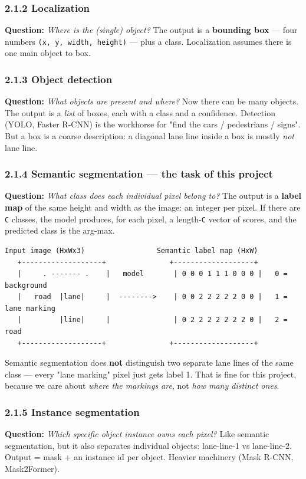 \documentclass[11pt]{article}
\begin{document}
\subsubsection*{2.1.2 Localization}
\textbf{Question:} \textit{Where is the (single) object?} The output is a \textbf{bounding box} --- four numbers \texttt{(x, y, width, height)} --- plus a class. Localization assumes there is one main object to box.

\subsubsection*{2.1.3 Object detection}
\textbf{Question:} \textit{What objects are present and where?} Now there can be many objects. The output is a \textit{list} of boxes, each with a class and a confidence. Detection (YOLO, Faster R-CNN) is the workhorse for "find the cars / pedestrians / signs". But a box is a coarse description: a diagonal lane line inside a box is mostly \textit{not} lane line.

\subsubsection*{2.1.4 Semantic segmentation --- the task of this project}
\textbf{Question:} \textit{What class does each individual pixel belong to?} The output is a \textbf{label map} of the same height and width as the image: an integer per pixel. If there are \texttt{C} classes, the model produces, for each pixel, a length-\texttt{C} vector of scores, and the predicted class is the arg-max.

\begin{Verbatim}[breaklines=true,breakanywhere=true,fontsize=\footnotesize]
   Input image (HxWx3)                 Semantic label map (HxW)
   +-------------------+               +-------------------+
   |     . ------- .    |   model       | 0 0 0 1 1 1 0 0 0 |   0 = background
   |   road  |lane|     |  -------->    | 0 0 2 2 2 2 2 0 0 |   1 = lane marking
   |         |line|     |               | 0 2 2 2 2 2 2 2 0 |   2 = road
   +-------------------+               +-------------------+
\end{Verbatim}

Semantic segmentation does \textbf{not} distinguish two separate lane lines of the same class --- every "lane marking" pixel just gets label 1. That is fine for this project, because we care about \textit{where the markings are}, not \textit{how many distinct ones}.

\subsubsection*{2.1.5 Instance segmentation}
\textbf{Question:} \textit{Which specific object instance owns each pixel?} Like semantic segmentation, but it also separates individual objects: lane-line-1 vs lane-line-2. Output = mask + an instance id per object. Heavier machinery (Mask R-CNN, Mask2Former).
\end{document}
